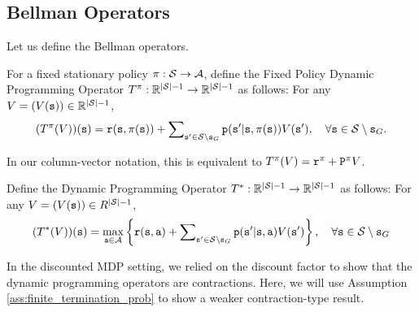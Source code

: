 \subsection{Bellman Operators}
Let us define the Bellman operators.
\begin{definition}
For a fixed stationary policy $\pi :\mathcal{S} \to \mathcal{A}$,
define the Fixed Policy Dynamic Programming Operator $T^\pi:\mathbb{R}^{|\mathcal{S}|-1}
\to \mathbb{R}^{|\mathcal{S}|-1}$ as follows: For any $V=(V({\tt s}))\in
\mathbb{R}^{|\mathcal{S}|-1}$,
\[(T_{}^\pi (V))({\tt s}) = {\tt r}({\tt s},\pi({\tt s})) + \sum\nolimits_{{\tt s}' \in \mathcal{S} \setminus {\tt s}_G} {{\tt p}({\tt s}'|{\tt s},\pi ({\tt s}))V({\tt s}')} ,\quad\forall {\tt s} \in \mathcal{S} \setminus {\tt s}_G.\]
\end{definition}
In our column-vector notation, this is equivalent to  $T^\pi
(V) = {{\tt r}^\pi } + {{\tt P}^\pi }V$.

\begin{definition}
Define the Dynamic Programming
Operator  $T^*:\mathbb R^{|\mathcal{S}| -1} \to \mathbb R^{|\mathcal{S}| -1}$ as
follows: For any $V=(V({\tt s}))\in R^{|\mathcal{S}|-1}$,
\[(T_{}^*(V))({\tt s}) = \mathop {\max }\limits_{{\tt a} \in \mathcal{A}} \left\{ {{\tt r}({\tt s},{\tt a}) +  \sum\nolimits_{{\tt s}' \in \mathcal{S} \setminus {\tt s}_G} {{\tt p}({\tt s}'|{\tt s},{\tt a})V({\tt s}')} } \right\},\quad \forall {\tt s} \in \mathcal{S}\setminus {\tt s}_G\]
\end{definition}

In the discounted MDP setting, we relied on the discount factor to show that the dynamic programming operators are contractions. Here, we will use Assumption \ref{ass:finite_termination_prob} to show a weaker contraction-type result.

